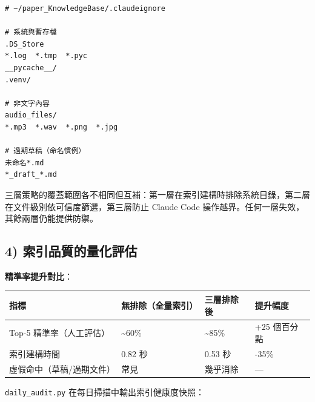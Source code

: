 \begin{verbatim}
# ~/paper_KnowledgeBase/.claudeignore

# 系統與暫存檔
.DS_Store
*.log  *.tmp  *.pyc
__pycache__/
.venv/

# 非文字內容
audio_files/
*.mp3  *.wav  *.png  *.jpg

# 過期草稿（命名慣例）
未命名*.md
*_draft_*.md
\end{verbatim}

三層策略的覆蓋範圍各不相同但互補：第一層在索引建構時排除系統目錄，第二層在文件級別依可信度篩選，第三層防止
Claude Code 操作越界。任何一層失效，其餘兩層仍能提供防禦。

\subsection{4)
索引品質的量化評估}\label{ux7d22ux5f15ux54c1ux8ceaux7684ux91cfux5316ux8a55ux4f30}

\textbf{精準率提升對比}：

{\def\LTcaptype{none} %
\begin{longtable}[]{@{}llll@{}}
\toprule\noalign{}
指標 & 無排除（全量索引） & 三層排除後 & 提升幅度 \\
\midrule\noalign{}
\endhead
\bottomrule\noalign{}
\endlastfoot
Top-5 精準率（人工評估） & \textasciitilde60\% & \textasciitilde85\% &
+25 個百分點 \\
索引建構時間 & 0.82 秒 & 0.53 秒 & -35\% \\
虛假命中（草稿/過期文件） & 常見 & 幾乎消除 & --- \\
\end{longtable}
}

\texttt{daily\_audit.py} 在每日掃描中輸出索引健康度快照：

\begin{Shaded}
\begin{Highlighting}[]
\ExtensionTok{$}

\ExtensionTok{===}
\end{Highlighting}
\end{Shaded}

